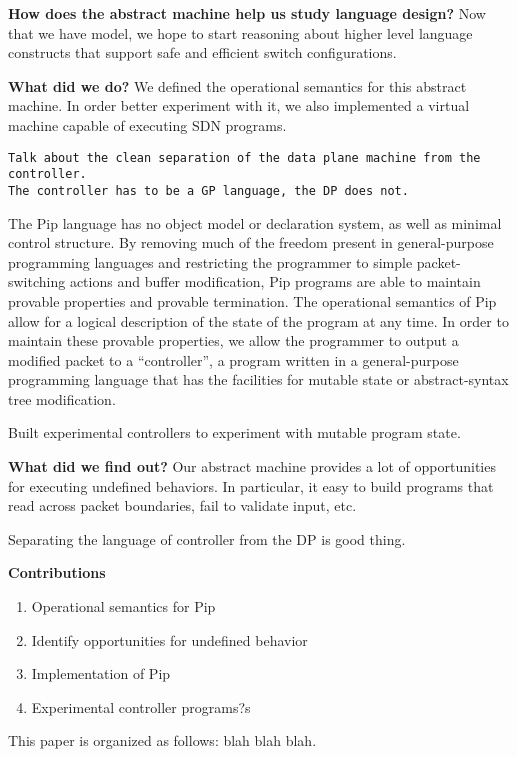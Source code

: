 \textbf{How does the abstract machine help us study language design?}
Now that we have model, we hope to start reasoning about higher level language constructs that support safe and efficient switch configurations. 

\textbf{What did we do?}
We defined the operational semantics for this abstract machine. In order better experiment with it, we also implemented a virtual machine capable of executing SDN programs.

\begin{verbatim}
Talk about the clean separation of the data plane machine from the controller.
The controller has to be a GP language, the DP does not.
\end{verbatim}
The Pip language has no object model or declaration system, as well as minimal control structure. By removing much of the freedom present in general-purpose programming languages and restricting the programmer to simple packet-switching actions and buffer modification, Pip programs are able to maintain provable properties and provable termination. The operational semantics of Pip allow for a logical description of the state of the program at any time. In order to maintain these provable properties, we allow the programmer to output a modified packet to a ``controller'', a program written in a general-purpose programming language that has the facilities for mutable state or abstract-syntax tree modification.

Built experimental controllers to experiment with mutable program state.

\textbf{What did we find out?}
Our abstract machine provides a lot of opportunities for executing undefined behaviors. In particular, it easy to build programs that read across packet boundaries, fail to validate input, etc.

Separating the language of controller from the DP is good thing.

\textbf{Contributions}
\begin{enumerate}
\item Operational semantics for Pip
\item Identify opportunities for undefined behavior
\item Implementation of Pip
\item Experimental controller programs?s
\end{enumerate}


This paper is organized as follows: blah blah blah.
